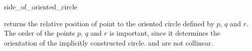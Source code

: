 \begin{ccRefFunction}{side_of_oriented_circle}

         {returns the relative position of point 
          to the oriented circle defined by $p$, $q$ and $r$.
	  The order of the points $p$, $q$ and $r$ is important,
	  since it determines the orientation of the implicitly
          constructed circle.
          \ccPrecond {} and  are not collinear.}
\end{ccRefFunction}

